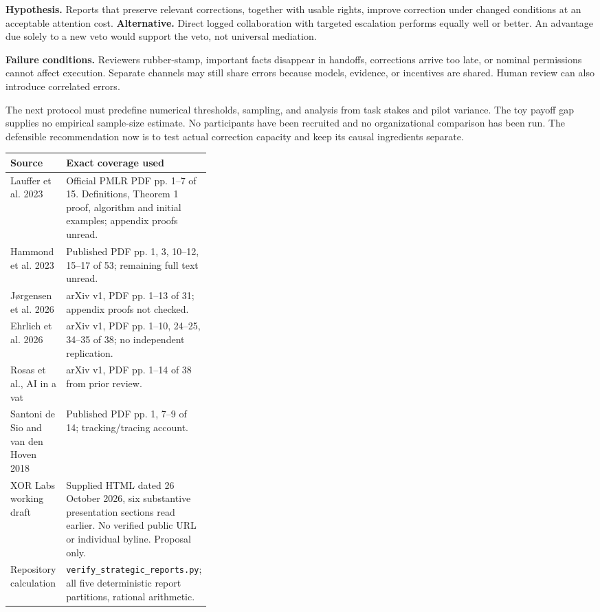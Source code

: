 \documentclass[11pt,letterpaper]{article}
\begin{document}
\textbf{Hypothesis.} Reports that preserve relevant corrections, together with usable rights, improve correction under changed conditions at an acceptable attention cost. \textbf{Alternative.} Direct logged collaboration with targeted escalation performs equally well or better. An advantage due solely to a new veto would support the veto, not universal mediation.

\textbf{Failure conditions.} Reviewers rubber-stamp, important facts disappear in handoffs, corrections arrive too late, or nominal permissions cannot affect execution. Separate channels may still share errors because models, evidence, or incentives are shared. Human review can also introduce correlated errors.

The next protocol must predefine numerical thresholds, sampling, and analysis from task stakes and pilot variance. The toy payoff gap supplies no empirical sample-size estimate. No participants have been recruited and no organizational comparison has been run. The defensible recommendation now is to test actual correction capacity and keep its causal ingredients separate.

\small
\begin{tabularx}{\linewidth}{L{0.34\linewidth}Y}\toprule
Source & Exact coverage used \\\midrule
Lauffer et al. 2023 & Official PMLR PDF pp. 1--7 of 15. Definitions, Theorem 1 proof, algorithm and initial examples; appendix proofs unread. \\
Hammond et al. 2023 & Published PDF pp. 1, 3, 10--12, 15--17 of 53; remaining full text unread. \\
J\o rgensen et al. 2026 & arXiv v1, PDF pp. 1--13 of 31; appendix proofs not checked. \\
Ehrlich et al. 2026 & arXiv v1, PDF pp. 1--10, 24--25, 34--35 of 38; no independent replication. \\
Rosas et al., AI in a vat & arXiv v1, PDF pp. 1--14 of 38 from prior review. \\
Santoni de Sio and van den Hoven 2018 & Published PDF pp. 1, 7--9 of 14; tracking/tracing account. \\
XOR Labs working draft & Supplied HTML dated 26 October 2026, six substantive presentation sections read earlier. No verified public URL or individual byline. Proposal only. \\
Repository calculation & \texttt{verify\_strategic\_reports.py}; all five deterministic report partitions, rational arithmetic. \\\bottomrule
\end{tabularx}
\normalsize
\end{document}

